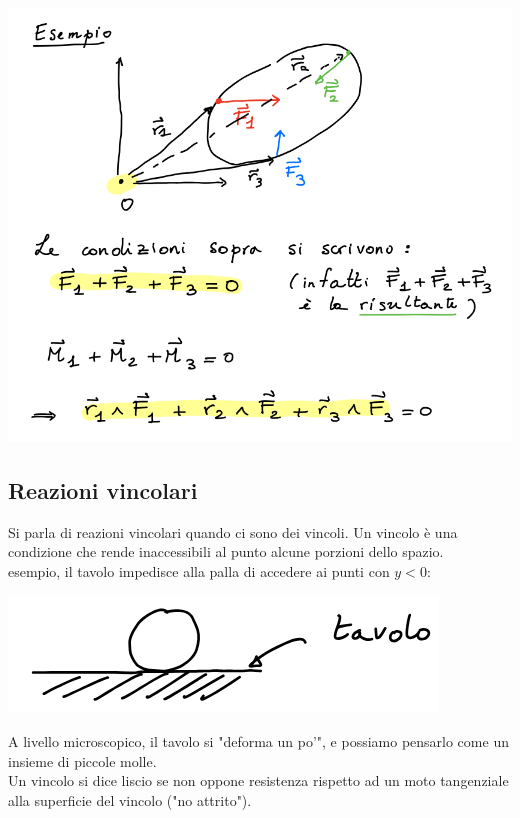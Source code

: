 \documentclass{article}
\begin{document}
\includegraphics[width=\columnwidth]{esempio-enunciato-principale-della-statica}

\subsection{Reazioni vincolari}

Si parla di reazioni vincolari quando ci sono dei vincoli.
Un vincolo è una condizione che rende inaccessibili al punto alcune porzioni dello spazio.\\

\noindent
esempio, il tavolo impedisce alla palla di accedere ai punti con $y < 0$:

\includegraphics[width=\columnwidth]{esempio-reazione-vincolare}

\noindent
A livello microscopico, il tavolo si "deforma un po'", e possiamo pensarlo come un insieme di piccole molle.\\

\noindent
Un vincolo si dice liscio se non oppone resistenza rispetto ad un moto tangenziale alla superficie del vincolo ("no attrito").
\end{document}
